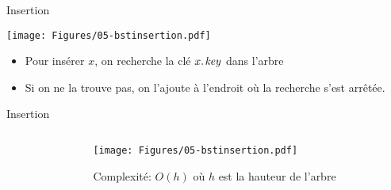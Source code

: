 \begin{frame}{Insertion}

\begin{center}
\texttt{[image: Figures/05-bstinsertion.pdf]}
\end{center}

\begin{itemize}
\item Pour insérer $x$, on recherche la clé $\attrib{x}{key}$ dans l'arbre
\item Si on ne la trouve pas, on l'ajoute à l'endroit où la recherche s'est arrêtée.
\end{itemize}
\end{frame}

\begin{frame}{Insertion}

  \begin{columns}
    \begin{column}{5cm}
\begin{center}
\begin{small}
\end{small}
\end{center}
    \end{column}
    \begin{column}{5cm}
      \begin{center}
      \texttt{[image: Figures/05-bstinsertion.pdf]}
      \end{center}

\bigskip

\bigskip

Complexité: $O(h)$ où $h$ est la hauteur de l'arbre
    \end{column}
  \end{columns}


\end{frame}

